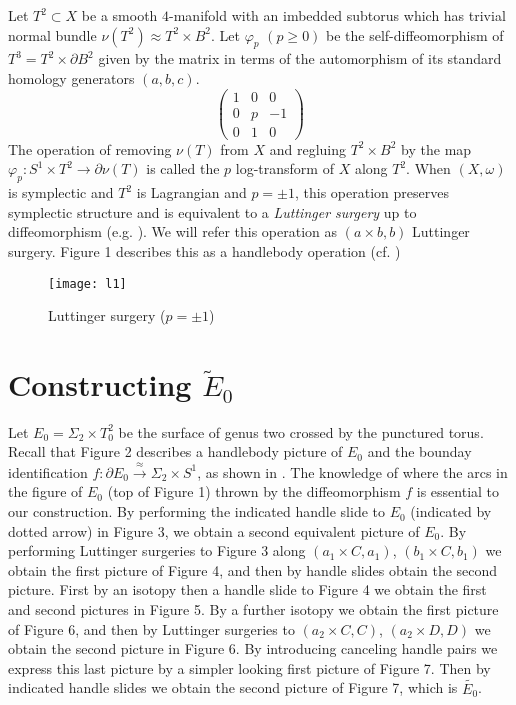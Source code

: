 \documentclass[11pt]{amsart}
\begin{document}
 Let $T^{2}\subset X$ be a smooth $4$-manifold with an imbedded subtorus which has trivial normal bundle $\nu (T^{2})\approx T^{2}\times B^2$.  Let $\varphi_p$ $(p\geq 0)$ be the self-diffeomorphism of $ T^{3}=T^{2}\times \partial B^{2}$ given by the matrix in terms of the automorphism of its standard homology generators $(a,b,c)$. 
\begin{equation*}
\left(
\begin{array}{ccc}
1 &0 &0  \\
0 &p &-1  \\
0 &1 &0
\end{array}
\right)
\end{equation*}
The operation of  removing $\nu (T) $ from $X$ and regluing $T^2\times B^2 $ by the map $\varphi_{p}: S^1 \times T^2 \to \partial \nu (T)$ is called the  $p$  log-transform of $X$ along $T^2$. When $(X, \omega)$ is symplectic and $T^{2}$ is Lagrangian and  $p=\pm1$, this operation preserves symplectic structure and is  equivalent to a {\it Luttinger surgery} up to diffeomorphism (e.g. \cite{a3}). We will refer this operation  as $(a \times b, b)$ Luttinger surgery. Figure 1 describes this as a handlebody operation (cf. \cite{ay})

    \begin{figure}[ht]  \begin{center}  
\texttt{[image: l1]}   
\caption{Luttinger surgery ($p=\pm 1$)} 
\end{center}
\end{figure} 

 

\section{Constructing $\tilde{E}_{0}$}

Let $E_{0}=\Sigma_{2}\times T^{2}_{0}$ be the surface of genus two crossed by the punctured torus. Recall that Figure 2 describes   a handlebody picture of $E_{0}$ and the bounday identification  $f: \partial E_{0}\stackrel{\approx}{\longrightarrow} \Sigma_{2}\times S^1$, as shown in \cite{a1}. The knowledge of where the arcs in the figure of $E_{0}$ (top of Figure 1) thrown by the diffeomorphism $f$ is essential to our construction.  By performing the indicated handle slide to $E_{0}$ (indicated by dotted arrow) in Figure 3, we obtain a second equivalent picture of $E_{0}$. By performing Luttinger surgeries to Figure 3  along $(a_1\times C, a_1)$, $ (b_1\times C, b_1)$ we obtain the first picture of Figure 4, and then by  handle slides obtain the second picture. First by an isotopy then a handle slide to Figure 4 we obtain the first and second pictures in Figure 5.  By a further isotopy we obtain the first picture of Figure 6, and then by Luttinger surgeries to $(a_2\times C, C)$, $(a_2\times D, D)$ we obtain the second picture in Figure 6. By introducing canceling handle pairs we express this last picture by a simpler looking first picture of Figure 7. Then by indicated handle slides we obtain the second picture of Figure 7, which is  $\tilde{E_{0}}$.
\end{document}
